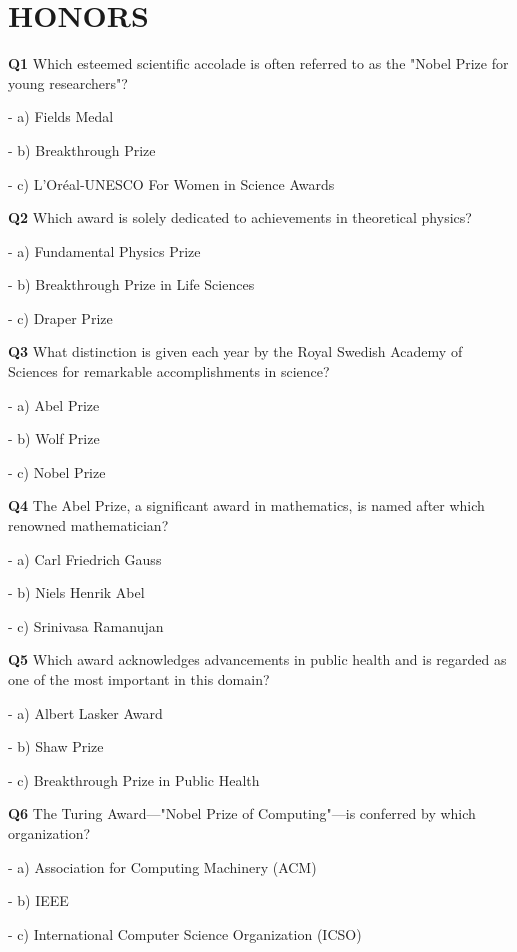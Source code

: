 \section{HONORS}

\textbf{Q1} Which esteemed scientific accolade is often referred to as the "Nobel Prize for young researchers"?\par
\quad - a) Fields Medal\par
\quad - b) Breakthrough Prize\par
\quad - c) L'Oréal‑UNESCO For Women in Science Awards\par

\textbf{Q2} Which award is solely dedicated to achievements in theoretical physics?\par
\quad - a) Fundamental Physics Prize\par
\quad - b) Breakthrough Prize in Life Sciences\par
\quad - c) Draper Prize\par

\textbf{Q3} What distinction is given each year by the Royal Swedish Academy of Sciences for remarkable accomplishments in science?\par
\quad - a) Abel Prize\par
\quad - b) Wolf Prize\par
\quad - c) Nobel Prize\par

\textbf{Q4} The Abel Prize, a significant award in mathematics, is named after which renowned mathematician?\par
\quad - a) Carl Friedrich Gauss\par
\quad - b) Niels Henrik Abel\par
\quad - c) Srinivasa Ramanujan\par

\textbf{Q5} Which award acknowledges advancements in public health and is regarded as one of the most important in this domain?\par
\quad - a) Albert Lasker Award\par
\quad - b) Shaw Prize\par
\quad - c) Breakthrough Prize in Public Health\par

\textbf{Q6} The Turing Award—"Nobel Prize of Computing"—is conferred by which organization?\par
\quad - a) Association for Computing Machinery (ACM)\par
\quad - b) IEEE\par
\quad - c) International Computer Science Organization (ICSO)\par

